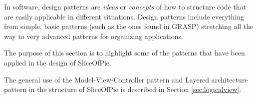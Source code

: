 In software, design patterns are \emph{ideas} or \emph{concepts} of how to structure code that are easily applicable
in different situations. Design patterns include everything from simple, basic patterns (such as the ones found in
GRASP) stretching all the way to very advanced patterns for organizing applications.

The purpose of this section is to highlight some of the patterns that have been applied in the design of SliceOfPie.

The general use of the Model-View-Controller pattern and Layered architecture pattern in the structure of SliceOfPie
is described in Section \ref{sec:logicalview}.







